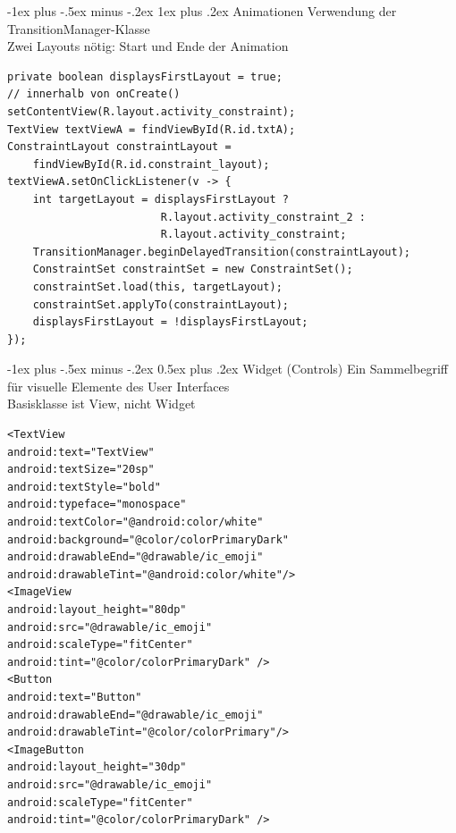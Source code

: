 \documentclass[10pt,landscape,a4paper]{article}
\makeatletter
\renewcommand{\section}{\@startsection{section}{1}{0mm}%
                                {-1ex plus -.5ex minus -.2ex}%
                                {0.5ex plus .2ex}%
                                {\normalfont\large\bfseries}}
\renewcommand{\subsubsection}{\@startsection{subsubsection}{3}{0mm}%
                                {-1ex plus -.5ex minus -.2ex}%
                                {1ex plus .2ex}%
                                {\normalfont\footnotesize\bfseries}}
\makeatother
\begin{document}
\begin{multicols*}{3}
\subsubsection{Animationen}
Verwendung der TransitionManager-Klasse\\
Zwei Layouts nötig: Start und Ende der Animation

\begin{verbatim}
private boolean displaysFirstLayout = true;
// innerhalb von onCreate()
setContentView(R.layout.activity_constraint);
TextView textViewA = findViewById(R.id.txtA);
ConstraintLayout constraintLayout = 
    findViewById(R.id.constraint_layout);
textViewA.setOnClickListener(v -> {
    int targetLayout = displaysFirstLayout ?
                        R.layout.activity_constraint_2 :
                        R.layout.activity_constraint;
    TransitionManager.beginDelayedTransition(constraintLayout);
    ConstraintSet constraintSet = new ConstraintSet();
    constraintSet.load(this, targetLayout);
    constraintSet.applyTo(constraintLayout);
    displaysFirstLayout = !displaysFirstLayout;
});
\end{verbatim}


\section{Widget (Controls)}
Ein Sammelbegriff für visuelle Elemente
des User Interfaces\\
Basisklasse ist View, nicht Widget

\begin{verbatim}
<TextView
android:text="TextView"
android:textSize="20sp"
android:textStyle="bold"
android:typeface="monospace"
android:textColor="@android:color/white"
android:background="@color/colorPrimaryDark"
android:drawableEnd="@drawable/ic_emoji"
android:drawableTint="@android:color/white"/>
<ImageView
android:layout_height="80dp"
android:src="@drawable/ic_emoji"
android:scaleType="fitCenter"
android:tint="@color/colorPrimaryDark" />
<Button
android:text="Button"
android:drawableEnd="@drawable/ic_emoji"
android:drawableTint="@color/colorPrimary"/>
<ImageButton
android:layout_height="30dp"
android:src="@drawable/ic_emoji"
android:scaleType="fitCenter"
android:tint="@color/colorPrimaryDark" />
\end{verbatim}

\end{multicols*}
\end{document}
